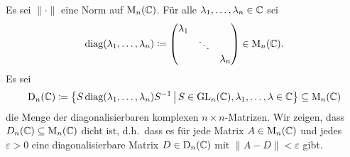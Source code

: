 \begin{question}[subtitle = Dichtheit der diagonalisierbaren Matrizen]{4}
  Es sei $\|\cdot\|$ eine Norm auf $\operatorname{M}_n(\mathbb{C})$.
  Für alle $\lambda_1, \dotsc, \lambda_n \in \mathbb{C}$ sei
  \[
    \operatorname{\operatorname{diag}}(\lambda_1, \dotsc, \lambda_n)
    \coloneqq
    \begin{pmatrix}
      \lambda_1 &         &           \\
                & \ddots  &           \\
                &         & \lambda_n
    \end{pmatrix}
    \in \operatorname{M}_n(\mathbb{C}).
  \]
  Es sei
  \[
    \operatorname{D}_n(\mathbb{C})
    \coloneqq
    \left\{
      S \operatorname{\operatorname{diag}}(\lambda_1, \dotsc, \lambda_n) S^{-1}
    \,\middle|\,
      S \in \operatorname{GL}_n(\mathbb{C}),
      \lambda_1, \dotsc, \lambda \in \mathbb{C}
    \right\}
    \subseteq \operatorname{M}_n(\mathbb{C})
  \]
  die Menge der diagonalisierbaren komplexen $n \times n$-Matrizen.
  Wir zeigen, dass $D_n(\mathbb{C}) \subseteq \operatorname{M}_n(\mathbb{C})$ dicht ist, d.h.\ dass es für jede Matrix $A \in \operatorname{M}_n(\mathbb{C})$ und jedes $\varepsilon > 0$ eine diagonalisierbare Matrix $D \in \operatorname{D}_n(\mathbb{C})$ mit $\|A-D\| < \varepsilon$ gibt.
  

\end{question}
